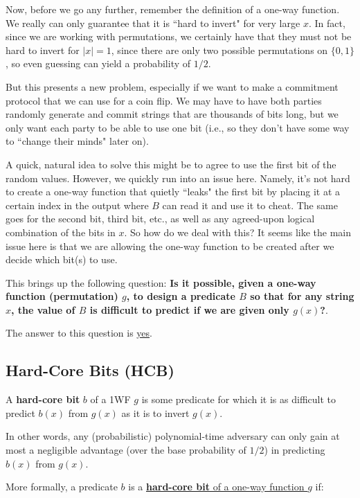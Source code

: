 \documentclass[11pt]{article}
\begin{document}
Now, before we go any further, remember the definition of a one-way function. We really can only guarantee that it is ``hard to invert" for very large \(x\). In fact, since we are working with permutations, we certainly have that they must not be hard to invert for \(|x|=1\), since there are only two possible permutations on \(\{0,1\}\), so even guessing can yield a probability of \(1/2\).\smallskip

But this presents a new problem, especially if we want to make a commitment protocol that we can use for a coin flip. We may have to have both parties randomly generate and commit strings that are thousands of bits long, but we only want each party to be able to use one bit (i.e., so they don't have some way to ``change their minds" later on).\medskip

A quick, natural idea to solve this might be to agree to use the first bit of the random values. However, we quickly run into an issue here. Namely, it's not hard to create a one-way function that quietly ``leaks" the first bit by placing it at a certain index in the output where \(B\) can read it and use it to cheat. The same goes for the second bit, third bit, etc., as well as any agreed-upon logical combination of the bits in \(x\). So how do we deal with this? It seems like the main issue here is that we are allowing the one-way function to be created after we decide which bit(s) to use. 

This brings up the following question: \textbf{Is it possible, given a one-way function (permutation) \(g\), to design a predicate \(B\) so that for any string \(x\), the value of \(B\) is difficult to predict if we are given only \(g(x)\)?}. 

The answer to this question is \underline{yes}.


\newpage
\subsection{Hard-Core Bits (HCB)}
A \textbf{hard-core bit} \(b\) of a 1WF \(g\) is some predicate for which it is as difficult to predict \(b(x)\) from \(g(x)\) as it is to invert \(g(x)\). 

In other words, any (probabilistic) polynomial-time adversary can only gain at most a negligible advantage (over the base probability of \(1/2\)) in predicting \(b(x)\) from \(g(x)\).\smallskip

More formally, a predicate \(b\) is a \underline{\textbf{hard-core bit} of a one-way function \(g\)} if:
\end{document}
